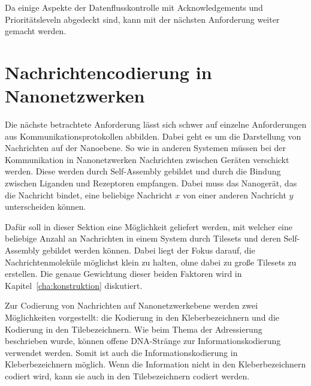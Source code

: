Da einige Aspekte der Datenflusskontrolle mit Acknowledgements und Prioritätsleveln abgedeckt sind, kann mit der nächsten Anforderung weiter gemacht werden. 

\section{Nachrichtencodierung in Nanonetzwerken}
\label{sec:message_code}

Die nächste betrachtete Anforderung lässt sich schwer auf einzelne Anforderungen aus Kommunikationsprotokollen abbilden. Dabei geht es um die Darstellung von Nachrichten auf der Nanoebene. So wie in anderen Systemen müssen bei der Kommunikation in Nanonetzwerken Nachrichten zwischen Geräten verschickt werden. Diese werden durch Self-Assembly gebildet und durch die Bindung zwischen Liganden und Rezeptoren empfangen. Dabei muss das Nanogerät, das die Nachricht bindet, eine beliebige Nachricht $x$ von einer anderen Nachricht $y$ unterscheiden können.

Dafür soll in dieser Sektion eine Möglichkeit geliefert werden, mit welcher eine beliebige Anzahl an Nachrichten in einem System durch Tilesets und deren Self-Assembly gebildet werden können. Dabei liegt der Fokus darauf, die Nachrichtenmoleküle möglichst klein zu halten, ohne dabei zu große Tilesets zu erstellen. Die genaue Gewichtung dieser beiden Faktoren wird in Kapitel~\ref{cha:konstruktion} diskutiert.

Zur Codierung von Nachrichten auf Nanonetzwerkebene werden zwei Möglichkeiten vorgestellt: die Kodierung in den Kleberbezeichnern und die Kodierung in den Tilebezeichnern.
Wie beim Thema der Adressierung beschrieben wurde, können offene DNA-Stränge zur Informationskodierung verwendet werden. Somit ist auch die Informationskodierung in Kleberbezeichnern möglich.
Wenn die Information nicht in den Kleberbezeichnern codiert wird, kann sie auch in den Tilebezeichnern codiert werden. 

